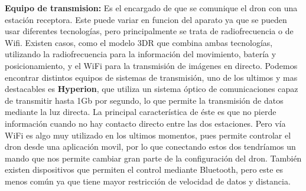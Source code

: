 \hspace{1 cm}\textbf{Equipo de transmision:} Es el encargado de que se comunique el dron con una estaci\'on receptora. Este puede variar en funcion del aparato ya que se pueden usar diferentes tecnolog\'ias, pero principalmente se trata de radiofrecuencia o de Wifi. Existen casos, como el modelo 3DR que combina ambas tecnolog\'ias, utilizando la radiofrecuencia para la informaci\'on del movimiento, bater\'ia y posicionamiento, y el WiFi para la transmisi\'on de im\'agenes en directo. Podemos encontrar distintos equipos de sistemas de transmisi\'on, uno de los ultimos y mas destacables es \textbf{Hyperion}, que utiliza un sistema \'optico de comunicaciones capaz de transmitir hasta 1Gb por segundo, lo que permite la transmisi\'on de datos mediante la luz directa. La principal caracter\'istica de \'este es que no pierde informaci\'on cuando no hay contacto directo entre las dos estaciones. Pero v\'ia WiFi es algo muy utilizado en los ultimos momentos, pues permite controlar el dron desde una aplicaci\'on movil, por lo que conectando estos dos tendr\'iamos un mando que nos permite cambiar gran parte de la configuraci\'on del dron. Tambi\'en existen dispositivos que permiten el control mediante Bluetooth, pero este es menos com\'un ya que tiene mayor restricci\'on de velocidad de datos y distancia. 


